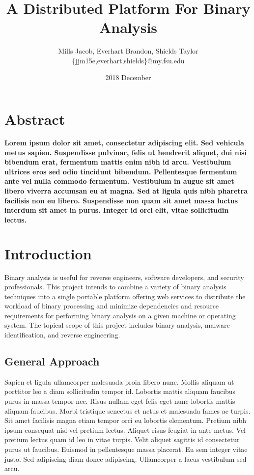 \documentclass[a4paper,12pt]{article}
\title{A Distributed Platform For Binary Analysis}
\date{2018 December}
\author{Mills Jacob, Everhart Brandon, Shields Taylor \\ \{jjm15e,everhart,shields\}@my.fsu.edu}
\begin{document}
\maketitle

\begin{multicols}{2}

\section*{Abstract}
\textbf{Lorem ipsum dolor sit amet, consectetur adipiscing elit. Sed vehicula metus sapien. Suspendisse pulvinar, felis ut hendrerit aliquet, dui nisi bibendum erat, fermentum mattis enim nibh id arcu. Vestibulum ultrices eros sed odio tincidunt bibendum. Pellentesque fermentum ante vel nulla commodo fermentum. Vestibulum in augue sit amet libero viverra accumsan eu at magna. Sed at ligula quis nibh pharetra facilisis non eu libero. Suspendisse non quam sit amet massa luctus interdum sit amet in purus. Integer id orci elit, vitae sollicitudin lectus.}

\section{Introduction}
Binary analysis is useful for reverse engineers, software developers, and security professionals. This project intends to combine a variety of binary analysis techniques into a single portable platform offering web services to distribute the workload of binary processing and minimize dependencies and resource requirements for performing binary analysis on a given machine or operating system. The topical scope of this project includes binary analysis, malware identification, and reverse engineering.

\subsection{General Approach}
Sapien et ligula ullamcorper malesuada proin libero nunc. Mollis aliquam ut porttitor leo a diam sollicitudin tempor id. Lobortis mattis aliquam faucibus purus in massa tempor nec. Risus nullam eget felis eget nunc lobortis mattis aliquam faucibus. Morbi tristique senectus et netus et malesuada fames ac turpis. Sit amet facilisis magna etiam tempor orci eu lobortis elementum. Pretium nibh ipsum consequat nisl vel pretium lectus. Aliquet risus feugiat in ante metus. Vel pretium lectus quam id leo in vitae turpis. Velit aliquet sagittis id consectetur purus ut faucibus. Euismod in pellentesque massa placerat. Eu sem integer vitae justo. Sed adipiscing diam donec adipiscing. Ullamcorper a lacus vestibulum sed arcu.


\end{multicols}
\end{document}
